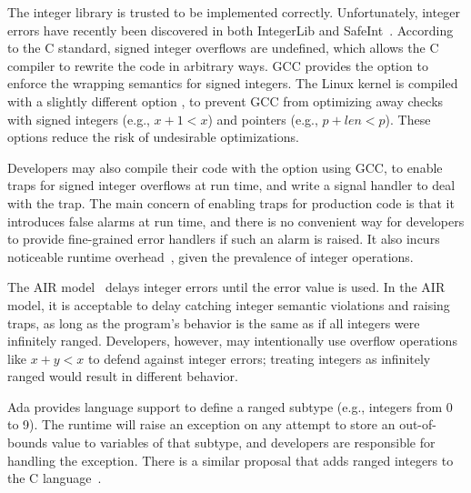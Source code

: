 The integer library is trusted to be implemented correctly.
Unfortunately, integer errors have recently been discovered in both
IntegerLib and SafeInt~\cite{ioc}.
%
%
%
According to the C standard, signed integer overflows are undefined,
which allows the C compiler to rewrite the code in arbitrary ways.
GCC provides the option  to enforce the wrapping semantics
for signed integers.  The Linux kernel is compiled with a slightly
different option , to prevent GCC from
optimizing away checks with signed integers (e.g., $x + 1 < x$) and
pointers (e.g., $p + \mathit{len} < p$).  These options reduce the
risk of undesirable optimizations.

Developers may also compile their code with the  option
using GCC, to enable traps for signed integer overflows at run time,
and write a signal handler to deal with the trap.
The main concern of enabling traps for production code
is that it introduces false alarms at run time, and there is no
convenient way for developers to provide fine-grained error handlers
if such an alarm is raised.  It also incurs noticeable runtime
overhead~\cite{ioc}, given the prevalence of integer operations.

The AIR model~\cite{air} delays integer errors until the error value
is used.  In the AIR model, it is acceptable to delay
catching integer semantic violations and raising traps, as long as the program's
behavior is the same as if all integers were infinitely ranged.
Developers, however, may intentionally use overflow operations like
$x + y < x$ to defend against integer errors; treating integers as
infinitely ranged would result in different behavior.
\fi

Ada provides language support
to define a ranged subtype (e.g., integers from 0 to 9).  The runtime
will raise an exception on any attempt to store an out-of-bounds
value to variables of that subtype, and developers are responsible
for handling the exception.  There is a similar proposal that adds
ranged integers to the C language~\cite{ranged-c}.

